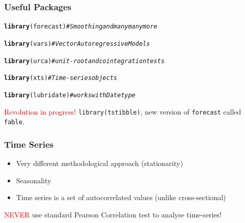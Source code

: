 \documentclass[12pt]{beamer}\usepackage[]{graphicx}\usepackage[]{color}
\makeatletter
\newcommand{\hlcom}[1]{\textcolor[rgb]{0.678,0.584,0.686}{\textit{#1}}}%
\newcommand{\hlstd}[1]{\textcolor[rgb]{0.345,0.345,0.345}{#1}}%
\newcommand{\hlkwd}[1]{\textcolor[rgb]{0.737,0.353,0.396}{\textbf{#1}}}%
\newenvironment{kframe}{%
 \def\at@end@of@kframe{}%
 \ifinner\ifhmode%
  \def\at@end@of@kframe{\end{minipage}}%
  \begin{minipage}{\columnwidth}%
 \fi\fi%
 \def\FrameCommand##1{\hskip\@totalleftmargin \hskip-\fboxsep
 \colorbox{shadecolor}{##1}\hskip-\fboxsep
     \hskip-\linewidth \hskip-\@totalleftmargin \hskip\columnwidth}%
 \MakeFramed {\advance\hsize-\width
   \@totalleftmargin\z@ \linewidth\hsize
   \@setminipage}}%
 {\par\unskip\endMakeFramed%
 \at@end@of@kframe}
\newenvironment{knitrout}{}{} %
\makeatother
\begin{document}
\begin{frame}[fragile]
\frametitle{Useful Packages}
\begin{knitrout}
\color{fgcolor}\begin{kframe}
\begin{alltt}
\hlkwd{library}\hlstd{(forecast)} \hlcom{# Smoothing and many many more}

\hlkwd{library}\hlstd{(vars)} \hlcom{# Vector Autoregressive Models}

\hlkwd{library}\hlstd{(urca)} \hlcom{# unit-root and cointegration tests}

\hlkwd{library}\hlstd{(xts)} \hlcom{# Time-series objects}

\hlkwd{library}\hlstd{(lubridate)} \hlcom{# works with Date type}
\end{alltt}
\end{kframe}
\end{knitrout}

\textcolor{red}{Revolution in progress!} \texttt{library(tstibble)}, new version of \texttt{forecast} called \texttt{fable}.
\end{frame}


\begin{frame}\large
\frametitle{Time Series}

\begin{itemize}
 \item Very different methodological approach (stationarity)
 \item Seasonality
 \item Time series is a set of autocorrelated values (unlike cross-sectional)
\end{itemize}

\textcolor{red}{\textsc{NEVER}} use standard Pearson Correlation test to analyse time-series!


\end{frame}


\end{document}
